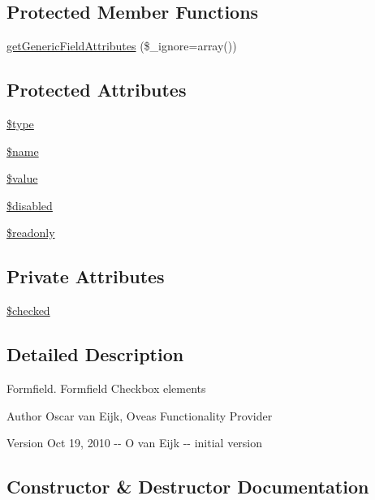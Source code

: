 \subsection*{Protected Member Functions}
\begin{DoxyCompactItemize}
\item 
\hyperlink{classFormField_a9f9d136ba8b4a793f22370aff43d592d}{getGenericFieldAttributes} (\$\_\-ignore=array())
\end{DoxyCompactItemize}
\subsection*{Protected Attributes}
\begin{DoxyCompactItemize}
\item 
\hyperlink{classFormField_a37bed21a1891e95be0e4a697e45ba51b}{\$type}
\item 
\hyperlink{classFormField_a23861f707bcd77bbace6300de9621746}{\$name}
\item 
\hyperlink{classFormField_a3c01e89834248eec8e2f145fbcfa0fbc}{\$value}
\item 
\hyperlink{classFormField_ab6f1907061890290e32cb2befc0a5f50}{\$disabled}
\item 
\hyperlink{classFormField_a78ba5d4b9127e75e8ccf86f397b5d9ac}{\$readonly}
\end{DoxyCompactItemize}
\subsection*{Private Attributes}
\begin{DoxyCompactItemize}
\item 
\hyperlink{classFormFieldCheckbox_a4abeb3a9445b5f31e84e32d257037f2a}{\$checked}
\end{DoxyCompactItemize}


\subsection{Detailed Description}
Formfield. Formfield Checkbox elements \begin{DoxyAuthor}{Author}
Oscar van Eijk, Oveas Functionality Provider 
\end{DoxyAuthor}
\begin{DoxyVersion}{Version}
Oct 19, 2010 -\/-\/ O van Eijk -\/-\/ initial version 
\end{DoxyVersion}


\subsection{Constructor \& Destructor Documentation}
